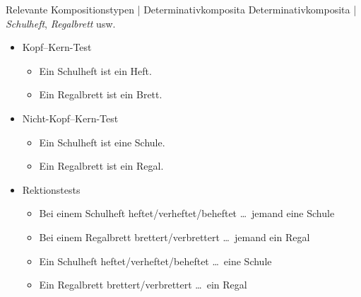 \begin{frame}
  {Relevante Kompositionstypen | Determinativkomposita}
  \onslide<+->
  Determinativkomposita | \textit{Schulheft}, \textit{Regalbrett} usw.
  \Halbzeile
  \begin{itemize}[<+->]
    \item Kopf--Kern-Test
      \begin{itemize}[<+->]
        \item Ein Schulheft ist ein Heft. \gruen{\Ck}
        \item Ein Regalbrett ist ein Brett. \gruen{\Ck}
      \end{itemize}
    \item Nicht-Kopf--Kern-Test
      \begin{itemize}[<+->]
        \item Ein Schulheft ist eine Schule. \rot{\Fl}
        \item Ein Regalbrett ist ein Regal. \rot{\Fl}
      \end{itemize}
      \Halbzeile
    \item Rektionstests
      \begin{itemize}[<+->]
        \item Bei einem Schulheft heftet\slash verheftet\slash beheftet \ldots\ jemand eine Schule \rot{\Fl}
        \item Bei einem Regalbrett brettert\slash verbrettert \dots\ jemand ein Regal \rot{\Fl}
        \Halbzeile
        \item Ein Schulheft heftet\slash verheftet\slash beheftet \ldots\ eine Schule \rot{\Fl}
        \item Ein Regalbrett brettert\slash verbrettert \dots\ ein Regal \rot{\Fl}
      \end{itemize}
  \end{itemize}
\end{frame}


